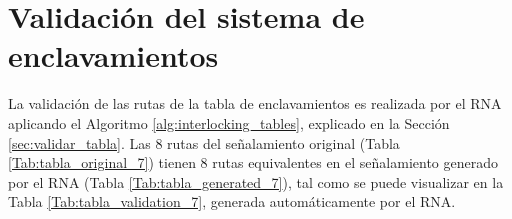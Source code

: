 \section{Validación del sistema de enclavamientos}

    La validación de las rutas de la tabla de enclavamientos es realizada por el RNA aplicando el Algoritmo \ref{alg:interlocking_tables}, explicado en la Sección \ref{sec:validar_tabla}. Las 8 rutas del señalamiento original (Tabla \ref{Tab:tabla_original_7}) tienen 8 rutas equivalentes en el señalamiento generado por el RNA (Tabla \ref{Tab:tabla_generated_7}), tal como se puede visualizar en la Tabla \ref{Tab:tabla_validation_7}, generada automáticamente por el RNA.

    \begin{table}[H]
        {
        \caption{Equivalencias entre las rutas originales y las generadas por el RNA.}
        \label{Tab:tabla_validation_7}
        \centering
            \begin{center}
            \end{center}
        }    
    \end{table}
    
